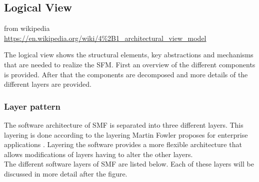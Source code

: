 \subsection{Logical View}

{from wikipedia\\\url{https://en.wikipedia.org/wiki/4\%2B1_architectural_view_model}}

The logical view shows the structural elements, key abstractions and mechanisms that are needed to realize the SFM. First an overview of the different components is provided. After that the components are decomposed and more details of the different layers are provided.




%	

\subsubsection*{Layer pattern}
The software architecture of SMF is separated into three different layers. This layering is done according to the layering Martin Fowler proposes for enterprise applications \cite{Fowler:2002:PEA:579257,Fowler:web:servicelayer}.
Layering the software provides a more flexible architecture that allows modifications of layers having to alter the other layers.\\
The different software layers of SMF are listed below. Each of these layers will be discussed in more detail after the figure.

